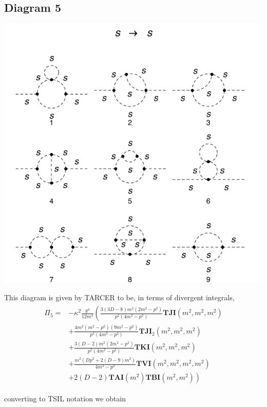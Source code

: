 \documentclass[11pt]{article}
\begin{document}
\subsection*{Diagram 5}
\noindent\begin{minipage}{0.3\textwidth}
\begin{center}
\includegraphics{2loop_5.pdf}



\end{center}
\end{minipage}
\noindent\begin{minipage}{0.7\textwidth}
This diagram is given by TARCER to be, in terms of divergent integrals,
\begin{align}
\begin{split}
\Pi_5 =&- \kappa^2 \frac{g^4}{12 m^4} \left( \frac{3(3D-8)m^2(2m^2-p^2)}{p^2(4m^2-p^2)}\mathbf{TJI}(m^2,m^2,m^2)\right. \\
&+ \frac{4m^2(m^2-p^2)(9m^2-p^2)}{p^2(4m^2-p^2)}\mathbf{TJI}_2(m^2,m^2,m^2)\\
&+\frac{3(D-2)m^2(2m^2-p^2)}{p^2(4m^2-p^2)}\mathbf{TKI}(m^2,m^2,m^2)\\
&+\frac{m^2(D p^2+2(D-9)m^2)}{4m^2-p^2}\mathbf{TVI}(m^2,m^2,m^2,m^2)\\
&\left.+2(D-2)\mathbf{TAI}(m^2) \mathbf{TBI}(m^2,m^2) \right)
\end{split}
\end{align}
\end{minipage}
converting to TSIL notation we obtain
\end{document}
